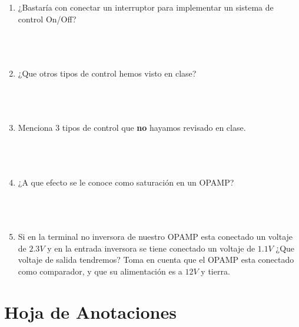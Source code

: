 	\begin{enumerate}
		\item ¿Bastaría con conectar un interruptor para implementar un sistema de control On/Off?\\ \\ \\ \\
		\item ¿Que otros tipos de control hemos visto en clase?\\ \\ \\ \\
		\item Menciona 3 tipos de control que {\bf no} hayamos revisado en clase.\\ \\ \\ \\
		\item ¿A que efecto se le conoce como saturación en un OPAMP?\\ \\ \\ \\
		\item Si en la terminal no inversora de nuestro OPAMP esta conectado un voltaje de $2.3 V$ y en la entrada inversora se tiene conectado un voltaje de $1.1 V$ ¿Que voltaje de salida tendremos? Toma en cuenta que el OPAMP esta conectado como comparador, y que su alimentación es a $12 V$ y tierra.\\
	\end{enumerate}


\clearpage
\section{Hoja de Anotaciones}

